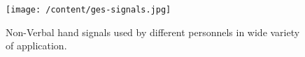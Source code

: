 \begin{figure}
	[h] \centering 
	\texttt{[image: /content/ges-signals.jpg]} \caption{Non-Verbal hand signals used by different personnels in wide variety of application. \cite{22} } \label{fg:ges:signal} 
\end{figure}
